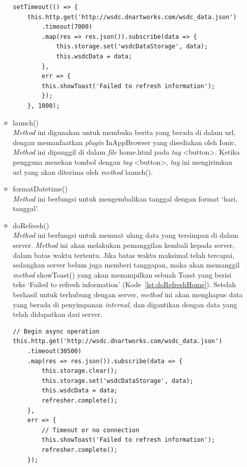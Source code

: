 \begin{itemize}
\begin{itemize}
		\begin{lstlisting}[language=html, label={lst:setTimeOutHome}, caption=Perintah setTimeout() pada Home]
setTimeout(() => {
	this.http.get('http://wsdc.dnartworks.com/wsdc_data.json')
		.timeout(7000)
		.map(res => res.json()).subscribe(data => {
       		this.storage.set('wsdcDataStorage', data);
        	this.wsdcData = data;
      	},
      	err => {
        this.showToast('Failed to refresh information');
      	});
    }, 1000);
\end{lstlisting}
		\item launch() \\
		\textit{Method} ini digunakan untuk membuka berita yang berada di dalam url, dengan memanfaatkan \textit{plugin} InAppBrowser yang disediakan oleh Ionic. \textit{Method} ini dipanggil di dalam \textit{file} home.html pada \textit{tag} <button>. Ketika pengguna menekan tombol dengan \textit{tag} <button>, \textit{tag} ini mengirimkan url yang akan diterima oleh \textit{method} launch(). 
		\item formatDatetime() \\
		\textit{Method} ini berfungsi untuk mengembalikan tanggal dengan format `hari, tanggal'.
		\item doRefresh() \\
		\textit{Method} ini berfungsi untuk memuat ulang data yang tersimpan di dalam server. \textit{Method} ini akan melakukan pemanggilan kembali kepada server, dalam batas waktu tertentu. Jika batas waktu maksimal telah tercapai, sedangkan server belum juga memberi tanggapan, maka akan memanggil \textit{method} showToast() yang akan menampilkan sebuah Toast yang berisi teks `Failed to refresh information' (Kode~\ref{lst:doRefreshHome}). Setelah berhasil untuk terhubung dengan server, \textit{method} ini akan menghapus data yang berada di penyimpanan \textit{internal}, dan digantikan dengan data yang telah didapatkan dari server.

\newpage

\begin{lstlisting}[language=html, label={lst:doRefreshHome}, caption=\textit{Method} doRefresh() pada Home]
// Begin async operation
this.http.get('http://wsdc.dnartworks.com/wsdc_data.json')
	.timeout(30500)
    .map(res => res.json()).subscribe(data => {
    	this.storage.clear();
    	this.storage.set('wsdcDataStorage', data);
    	this.wsdcData = data;
    	refresher.complete();
    },
    err => {
    	// Timeout or no connection
        this.showToast('Failed to refresh information');
        refresher.complete();
    });


\end{lstlisting}
\end{itemize}
\end{itemize}
